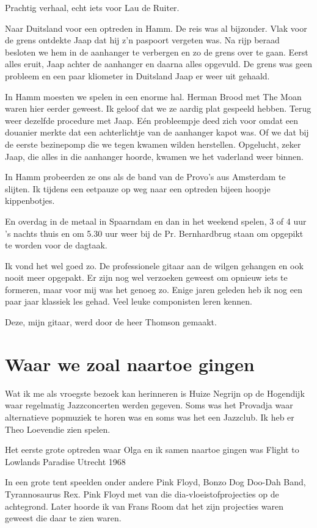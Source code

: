 \documentclass[10pt,twoside,openright]{memoir}
\begin{document}
Prachtig verhaal, echt iets voor Lau de Ruiter.

Naar Duitsland voor een optreden in Hamm. De reis was al bijzonder. Vlak voor de grens ontdekte Jaap dat hij z’n paspoort vergeten was. Na rijp beraad besloten we hem in de aanhanger te verbergen en zo de grens over te gaan. Eerst alles eruit, Jaap achter de aanhanger en daarna alles opgevuld. De grens was geen probleem en een paar kliometer in Duitsland Jaap er weer uit gehaald. 

In Hamm moesten we spelen in een enorme hal. Herman Brood met The Moan waren hier eerder geweest. Ik geloof dat we ze aardig plat gespeeld hebben. Terug weer dezelfde procedure met Jaap. Eén probleempje deed zich voor omdat een douanier merkte dat een achterlichtje van de aanhanger kapot was. Of we dat bij de eerste bezinepomp die we tegen kwamen wilden herstellen. Opgelucht, zeker Jaap, die alles in die aanhanger hoorde, kwamen we het vaderland weer binnen.

In Hamm probeerden ze ons als de band van de Provo’s aus Amsterdam te slijten. Ik tijdens een eetpauze op weg naar een optreden bijeen hoopje kippenbotjes.

En overdag in de metaal in Spaarndam en dan in het weekend spelen, 3 of 4 uur ’s nachts thuis en om 5.30 uur weer bij de Pr. Bernhardbrug staan om opgepikt te worden voor de dagtaak. 

Ik vond het wel goed zo. De professionele gitaar aan de wilgen gehangen en ook nooit meer opgepakt. Er zijn nog wel verzoeken geweest om opnieuw iets te formeren, maar voor mij was het genoeg zo. Enige jaren geleden heb ik nog een paar jaar klassiek les gehad. Veel leuke componisten leren kennen.

Deze, mijn gitaar, werd door de heer Thomson gemaakt. 

\chapter{Waar we zoal naartoe gingen} %
\label{cha:naartoegaan}

Wat ik me als vroegste bezoek kan herinneren is Huize Negrijn op de Hogendijk waar regelmatig Jazzconcerten werden gegeven. Soms was het Provadja waar alternatieve popmuziek te horen was en soms was het een Jazzclub. Ik heb er Theo Loevendie zien spelen.

Het eerste grote optreden waar Olga en ik samen naartoe gingen was 
Flight to Lowlands Paradise Utrecht 1968

In een grote tent speelden onder andere Pink Floyd, Bonzo Dog Doo-Dah Band, Tyrannosaurus Rex. Pink Floyd met van die dia-vloeistofprojecties op de achtegrond. Later hoorde ik van Frans Room dat het zijn projecties waren geweest die daar te zien waren. 
\end{document}
